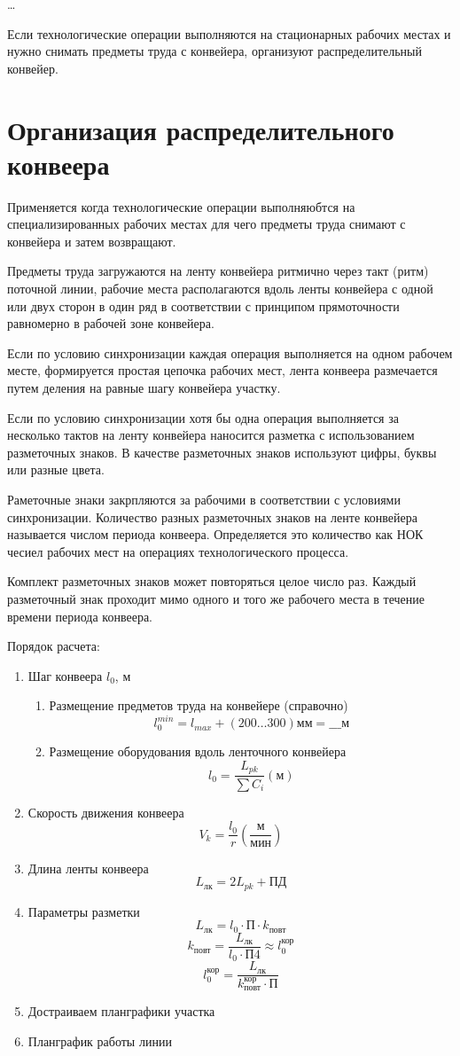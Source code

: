 \documentclass[14pt,a4paper,oneside]{extarticle}
\begin{document}
\dots

Если технологические операции выполняются на стационарных рабочих местах и нужно снимать предметы труда с конвейера, организуют распределительный конвейер.

\section{Организация распределительного конвеера}

Применяется когда технологические операции выполняюбтся на специализированных рабочих местах для чего предметы труда снимают с конвейера и затем возвращают.

Предметы труда загружаются на ленту конвейера ритмично через такт (ритм) поточной линии, рабочие места располагаются вдоль ленты конвейера с одной или двух сторон в один ряд в соответствии с принципом прямоточности равномерно в рабочей зоне конвейера.

Если по условию синхронизации каждая операция выполняется на одном рабочем месте, формируется простая цепочка рабочих мест, лента конвеера размечается путем деления на равные шагу конвейера участку.

Если по условию синхронизации хотя бы одна операция выполняется за несколько тактов на ленту конвейера наносится разметка с использованием разметочных знаков. В качестве разметочных знаков используют цифры, буквы или разные цвета.

Раметочные знаки закрпляются за рабочими в соответствии с условиями синхронизации. Количество разных разметочных знаков на ленте конвейера называется числом периода конвеера. Определяется это количество как НОК чесиел рабочих мест на операциях технологического процесса.

Комплект разметочных знаков может повторяться целое число раз. Каждый разметочный знак проходит мимо одного и того же рабочего места в течение времени периода конвеера.

Порядок расчета:

\begin{enumerate}
    \item Шаг конвеера $l_0$, м 
    \begin{enumerate}
        \item Размещение предметов труда на конвейере (справочно) \[l_0^{min}=l_{max}+(200\dots300)\text{мм}=\_\_\_\text{м}\]
        \item Размещение оборудования вдоль ленточного конвейера \[l_0=\frac{L_{pk}}{\sum C_i}(\text{м})\]
    \end{enumerate}
    \item Скорость движения конвеера \[V_k=\frac{l_0}{r}\left( \frac{\text{м}}{\text{мин}} \right)\]
    \item Длина ленты конвеера \[L_\text{лк}=2L_{pk}+\text{ПД}\]
    \item Параметры разметки \[L_\text{лк}=l_0\cdot\text{П}\cdot k_\text{повт}\] \[k_\text{повт}=\frac{L_\text{лк}}{l_0\cdot\text{П4}}\approx l_0^\text{кор}\] \[l_0^\text{кор}=\frac{L_\text{лк}}{k_\text{повт}^\text{кор}\cdot\text{П}}\]
    \item Достраиваем планграфики участка
    \item Планграфик работы линии
\end{enumerate}
\end{document}
